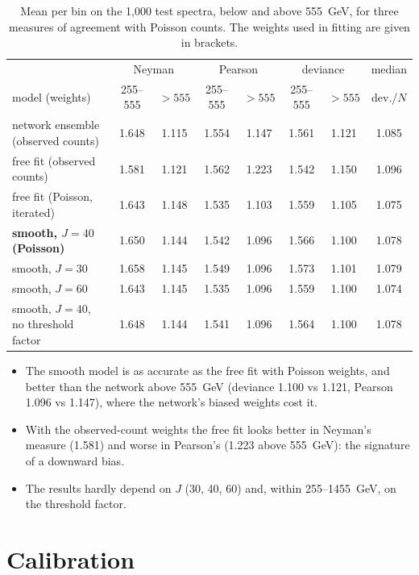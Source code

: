 \begin{table}[h]
\centering
\small
\begin{tabular}{lccccccc}
\toprule
 & \multicolumn{2}{c}{Neyman} & \multicolumn{2}{c}{Pearson} & \multicolumn{2}{c}{deviance} & median \\
model (weights) & 255--555 & $>555$ & 255--555 & $>555$ & 255--555 & $>555$ & dev./$N$ \\
\midrule
network ensemble (observed counts)  & 1.648 & 1.115 & 1.554 & 1.147 & 1.561 & 1.121 & 1.085 \\
free fit (observed counts)          & 1.581 & 1.121 & 1.562 & 1.223 & 1.542 & 1.150 & 1.096 \\
free fit (Poisson, iterated)        & 1.643 & 1.148 & 1.535 & 1.103 & 1.559 & 1.105 & 1.075 \\
\textbf{smooth, $J = 40$ (Poisson)} & 1.650 & 1.144 & 1.542 & 1.096 & 1.566 & 1.100 & 1.078 \\
smooth, $J = 30$                    & 1.658 & 1.145 & 1.549 & 1.096 & 1.573 & 1.101 & 1.079 \\
smooth, $J = 60$                    & 1.643 & 1.145 & 1.535 & 1.096 & 1.559 & 1.100 & 1.074 \\
smooth, $J = 40$, no threshold factor & 1.648 & 1.144 & 1.541 & 1.096 & 1.564 & 1.100 & 1.078 \\
\bottomrule
\end{tabular}
\caption{Mean per bin on the 1,000 test spectra, below and above 555~GeV, for three measures
of agreement with Poisson counts. The weights used in fitting are given in brackets.}
\label{tab:acc}
\end{table}

\begin{itemize}
  \item The smooth model is as accurate as the free fit with Poisson weights, and better than
    the network above 555~GeV (deviance 1.100 vs 1.121, Pearson 1.096 vs 1.147), where the
    network's biased weights cost it.
  \item With the observed-count weights the free fit looks better in Neyman's measure (1.581)
    and worse in Pearson's (1.223 above 555~GeV): the signature of a downward bias.
  \item The results hardly depend on $J$ (30, 40, 60) and, within 255--1455~GeV, on the
    threshold factor.
\end{itemize}

\section{Calibration}

